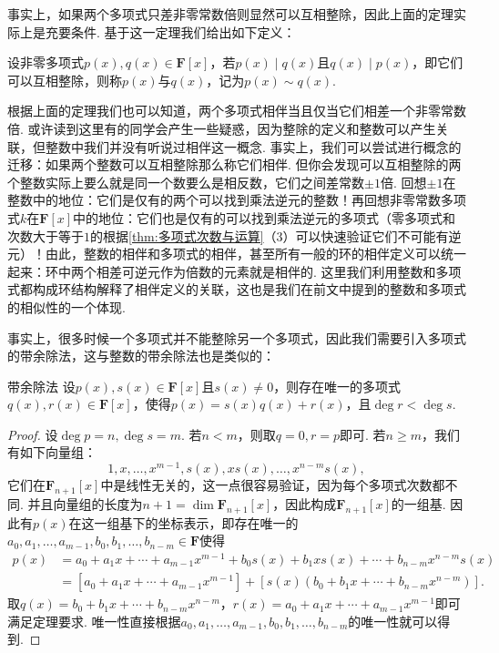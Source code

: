 事实上，如果两个多项式只差非零常数倍则显然可以互相整除，因此上面的定理实际上是充要条件. 基于这一定理我们给出如下定义：
\begin{definition}{}{}
    设非零多项式$p(x),q(x)\in\mathbf{F}[x]$，若$p(x)\mid q(x)$且$q(x)\mid p(x)$，即它们可以互相整除，则称$p(x)$与$q(x)$，记为$p(x)\sim q(x)$.
\end{definition}

根据上面的定理我们也可以知道，两个多项式相伴当且仅当它们相差一个非零常数倍. 或许读到这里有的同学会产生一些疑惑，因为整除的定义和整数可以产生关联，但整数中我们并没有听说过相伴这一概念. 事实上，我们可以尝试进行概念的迁移：如果两个整数可以互相整除那么称它们相伴. 但你会发现可以互相整除的两个整数实际上要么就是同一个数要么是相反数，它们之间差常数$\pm 1$倍. 回想$\pm 1$在整数中的地位：它们是仅有的两个可以找到乘法逆元的整数！再回想非零常数多项式$k$在$\mathbf{F}[x]$中的地位：它们也是仅有的可以找到乘法逆元的多项式（零多项式和次数大于等于$1$的根据\autoref{thm:多项式次数与运算}（3）可以快速验证它们不可能有逆元）！由此，整数的相伴和多项式的相伴，甚至所有一般的环的相伴定义可以统一起来：环中两个相差可逆元作为倍数的元素就是相伴的. 这里我们利用整数和多项式都构成环结构解释了相伴定义的关联，这也是我们在前文中提到的整数和多项式的相似性的一个体现.

事实上，很多时候一个多项式并不能整除另一个多项式，因此我们需要引入多项式的带余除法，这与整数的带余除法也是类似的：
\begin{theorem}{}{带余除法}
    设$p(x),s(x)\in\mathbf{F}[x]$且$s(x)\neq 0$，则存在唯一的多项式$q(x),r(x)\in\mathbf{F}[x]$，使得$p(x)=s(x)q(x)+r(x)$，且$\deg r<\deg s$.
\end{theorem}
\begin{proof}
    设$\deg p=n,\deg s=m$. 若$n<m$，则取$q=0,r=p$即可. 若$n\geqslant m$，我们有如下向量组：
    \[1,x,\ldots,x^{m-1},s(x),xs(x),\ldots,x^{n-m}s(x),\]
    它们在$\mathbf{F}_{n+1}[x]$中是线性无关的，这一点很容易验证，因为每个多项式次数都不同. 并且向量组的长度为$n+1=\dim\mathbf{F}_{n+1}[x]$，因此构成$\mathbf{F}_{n+1}[x]$的一组基. 因此有$p(x)$在这一组基下的坐标表示，即存在唯一的$a_0,a_1,\ldots,a_{m-1},b_0,b_1,\ldots,b_{n-m}\in\mathbf{F}$使得
    \begin{align*}
        p(x) & =a_0+a_1x+\cdots+a_{m-1}x^{m-1}+b_0s(x)+b_1xs(x)+\cdots+b_{n-m}x^{n-m}s(x) \\
             & =[a_0+a_1x+\cdots+a_{m-1}x^{m-1}]+[s(x)(b_0+b_1x+\cdots+b_{n-m}x^{n-m})].
    \end{align*}
    取$q(x)=b_0+b_1x+\cdots+b_{n-m}x^{n-m}$，$r(x)=a_0+a_1x+\cdots+a_{m-1}x^{m-1}$即可满足定理要求. 唯一性直接根据$a_0,a_1,\ldots,a_{m-1},b_0,b_1,\ldots,b_{n-m}$的唯一性就可以得到.
\end{proof}

